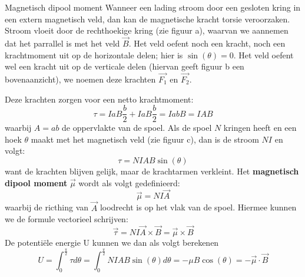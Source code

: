 \begin{theo}{Magnetisch dipool moment}
    Wanneer een lading stroom door een gesloten kring in een extern magnetisch veld, dan kan de magnetische kracht torsie veroorzaken.
    Stroom vloeit door de rechthoekige kring (zie figuur a), waarvan we aannemen dat het parrallel is met het veld $\Vec{B}$.
    Het veld oefent noch een kracht, noch een krachtmoment uit op de horizontale delen; hier is $\sin(\theta) = 0$. Het veld oefent wel een kracht uit op de verticale delen
    (hiervan geeft figuur b een bovenaanzicht), we noemen deze krachten $\Vec{F_1}$ en $\Vec{F_2}$.


    \vspace{0.1cm}\hspace{-0.5cm}\begin{minipage}{0.76\textwidth}
        Deze krachten zorgen voor een netto krachtmoment:
        \begin{equation*}
            \tau = IaB\dfrac{b}{2} + IaB\dfrac{b}{2} = IabB = IAB
        \end{equation*}
        waarbij $A = ab$ de oppervlakte van de spoel.
        Als de spoel $N$ kringen heeft en een hoek $\theta$ maakt met het magnetisch veld (zie figuur c),
        dan is de stroom $NI$ en volgt:
        \begin{equation*}
            \tau = NIAB\sin(\theta)
        \end{equation*}
        want de krachten blijven gelijk, maar de krachtarmen verkleint.
        Het \textbf{magnetisch dipool moment} $\Vec{\mu}$ wordt als volgt gedefinieerd:
        \begin{equation*}
            \Vec{\mu} = NI\Vec{A}
        \end{equation*}
        waarbij de ricthing van $\Vec{A}$ loodrecht is op het vlak van de spoel. Hiermee kunnen we de formule vectorieel schrijven:
        \begin{equation*}
            \Vec{\tau} = NI\Vec{A} \times \Vec{B} = \Vec{\mu} \times \Vec{B}
        \end{equation*}
        De potentiële energie U kunnen we dan als volgt berekenen
        \begin{equation*}
            U = \int_0^{\tfrac{\pi}{2}} \tau d\theta = \int_0^{\tfrac{\pi}{2}} NIAB\sin(\theta) d\theta = -\mu B\cos(\theta) = -\Vec{\mu} \cdot \Vec{B}
        \end{equation*}
    \end{minipage}

\end{theo}
